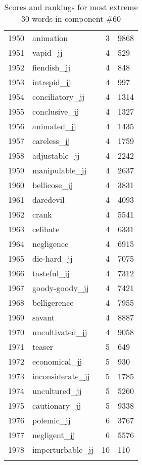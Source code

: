 \begin{longtable}[!htbp]{| rlr@{.}l |}
    1950 & animation & 3 & 9868 \\
    1951 & vapid\_jj & 4 & 529 \\
    1952 & fiendish\_jj & 4 & 848 \\
    1953 & intrepid\_jj & 4 & 997 \\
    1954 & conciliatory\_jj & 4 & 1314 \\
    1955 & conclusive\_jj & 4 & 1327 \\
    1956 & animated\_jj & 4 & 1435 \\
    1957 & careless\_jj & 4 & 1759 \\
    1958 & adjustable\_jj & 4 & 2242 \\
    1959 & manipulable\_jj & 4 & 2637 \\
    1960 & bellicose\_jj & 4 & 3831 \\
    1961 & daredevil & 4 & 4093 \\
    1962 & crank & 4 & 5541 \\
    1963 & celibate & 4 & 6331 \\
    1964 & negligence & 4 & 6915 \\
    1965 & die-hard\_jj & 4 & 7075 \\
    1966 & tasteful\_jj & 4 & 7312 \\
    1967 & goody-goody\_jj & 4 & 7421 \\
    1968 & belligerence & 4 & 7955 \\
    1969 & savant & 4 & 8887 \\
    1970 & uncultivated\_jj & 4 & 9058 \\
    1971 & teaser & 5 & 649 \\
    1972 & economical\_jj & 5 & 930 \\
    1973 & inconsiderate\_jj & 5 & 1785 \\
    1974 & uncultured\_jj & 5 & 5260 \\
    1975 & cautionary\_jj & 5 & 9338 \\
    1976 & polemic\_jj & 6 & 3767 \\
    1977 & negligent\_jj & 6 & 5576 \\
    1978 & imperturbable\_jj & 10 & 110 \\
    \hline
    \caption{Scores and rankings for most extreme 30 words in component \#60} \\
\end{longtable}
